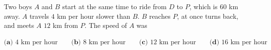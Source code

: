 Two boys $A$ and $B$ start at the same time to ride from $D$ to $P$, which is $60$ km away. $A$ travels $4$ km per hour slower than $B$. $B$ reaches $P$, at once turns back, and meets $A$ $12$ km from $P$. The speed of $A$ was

$\textbf{(a) }4\text{ km per hour}\qquad\textbf{(b) }8\text{ km per hour}\qquad\textbf{(c) }12\text{ km per hour}\qquad\textbf{(d) }16\text{ km per hour}$
